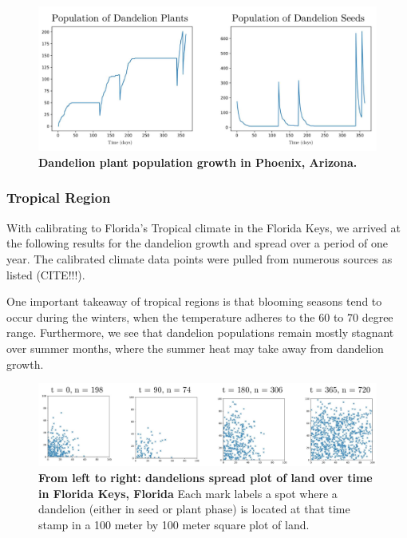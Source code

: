 \begin{figure}[h!]
\centering
    \includegraphics[scale=0.5]{figures/arizonapopulation.pdf}
    \captionsetup{width=0.9\textwidth}
    \caption{\textbf{Dandelion plant population growth in Phoenix, Arizona.}}
    \label{fig:arizonapopulation}
\end{figure}

\subsubsection{Tropical Region}

With calibrating to Florida's Tropical climate in the Florida Keys, we arrived at the following results for the dandelion growth and spread over a period of one year. The calibrated climate data points were pulled from numerous sources as listed (CITE!!!).

One important takeaway of tropical regions is that blooming seasons tend to occur during the winters, when the temperature adheres to the 60 to 70 degree range. Furthermore, we see that dandelion populations remain mostly stagnant over summer months, where the summer heat may take away from dandelion growth.

\begin{figure}[h!]
\centering
    \includegraphics[scale=0.6]{figures/floridadistributions.pdf}
    \captionsetup{width=0.9\textwidth}
    \caption{\textbf{From left to right: dandelions spread plot of land over time in Florida Keys, Florida} Each mark labels a spot where a dandelion (either in seed or plant phase) is located at that time stamp in a 100 meter by 100 meter square plot of land.}
    \label{fig:floridaspread}
\end{figure}

